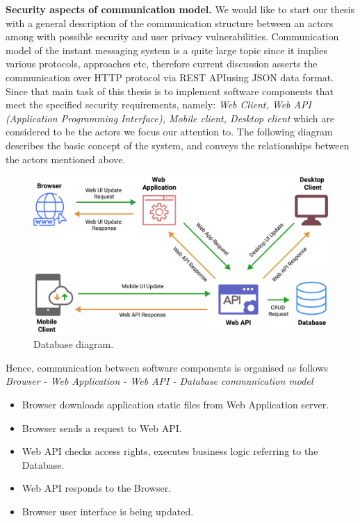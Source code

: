 \textbf{Security aspects of communication model.} We would like to start our thesis with a general description of the
communication structure between an actors among with possible security and user privacy vulnerabilities.
Communication model of the instant messaging system is a quite large topic since it implies various protocols, approaches etc,
therefore current discussion asserts the communication over HTTP protocol via REST API\@ using JSON data format.
Since that main task of this thesis is to implement software components that meet the specified security requirements,
namely: \textit{Web Client, Web API (Application Programming Interface), Mobile client, Desktop client} which are
considered to be the actors we focus our attention to.
The following diagram describes the basic concept of the system, and conveys the relationships between the actors mentioned above.

\begin{figure}[H]
    \centering
    \includegraphics[width=1\textwidth]{Pictures/Threat_Modeling}
    \caption{Database diagram.}\label{fig:figure6}
\end{figure}

Hence, communication between software components is organised as follows\\

\textit{Browser - Web Application - Web API - Database communication model}
\begin{itemize}
    \item Browser downloads application static files from Web Application server.
    \item Browser sends a request to Web API\@.
    \item Web API checks access rights, executes business logic referring to the Database.
    \item Web API responds to the Browser.
    \item Browser user interface is being updated.
\end{itemize}

